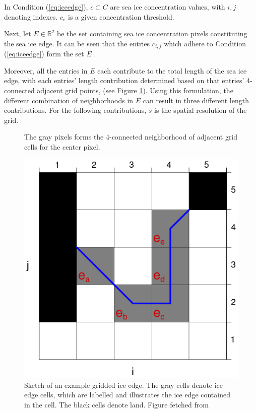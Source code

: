 \documentclass[../main/thesis.tex]{subfiles}
\begin{document}
In Condition (\ref{eq:iceedge}), $c \subset C$ are sea ice concentration values, with $i,j$ denoting indexes. $c_e$ is a given concentration threshold.

Next, let $E \in{\mathbb{R}^2}$ be the set containing sea ice concentration pixels constituting the sea ice edge. It can be seen that the entries $c_{i,j}$ which adhere to Condition (\ref{eq:iceedge}) form the set $E$ \citep{Melsom2019}.

Moreover, all the entries in $E$ each contribute to the total length of the sea ice edge, with each entries' length contribution determined based on that entries' 4-connected adjacent grid points, (see Figure \ref{fig:4-connection}). Using this formulation, the different combination of neighborhoods in $E$ can result in three different length contributions. For the following contributions, $s$ is the spatial resolution of the grid.

\begin{figure}
    \centering
    
    \caption{\label{fig:4-connection}The gray pixels forms the 4-connected neighborhood of adjacent grid cells for the center pixel.}
\end{figure}

\begin{figure}
    \centering
    \includegraphics[width = .5\textwidth]{MelsomIEL.pdf}
    \caption{\label{fig:iceedgeschematic}Sketch of an example gridded ice edge. The gray cells denote ice edge cells, which are labelled and illustrates the ice edge contained in the cell. The black cells denote land. Figure fetched from \protect\citet{Melsom2019}}
\end{figure}
\end{document}
